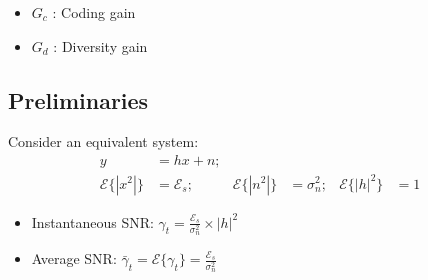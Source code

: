 \documentclass[a4paper, 10pt]{article}
\begin{document}
\hfill
\begin{minipage}[hbt]{5cm}
	\centering
		\begin{itemize}
			\item $G_c$ : Coding gain
			\item $G_d$ : Diversity gain
		\end{itemize}
\end{minipage}

\subsection{Preliminaries}
Consider an equivalent system:
\begin{align*}
	y &= hx +n;\\
	\mathcal{E}\{|x^2|\} &= \mathcal{E}_s; & \mathcal{E}\{|n^2|\} &= \sigma_n^2; & \mathcal{E}\{|h|^2\} &= 1
\end{align*}
\begin{itemize}
	\item Instantaneous SNR: $\gamma_t = \frac{\mathcal{E}_s}{\sigma_n^2}\times |h|^2$
\item Average SNR: $\bar{\gamma}_t = \mathcal{E}\{\gamma_t\} = \frac{\mathcal{E}_s}{\sigma_n^2}$
\end{itemize}
\end{document}
